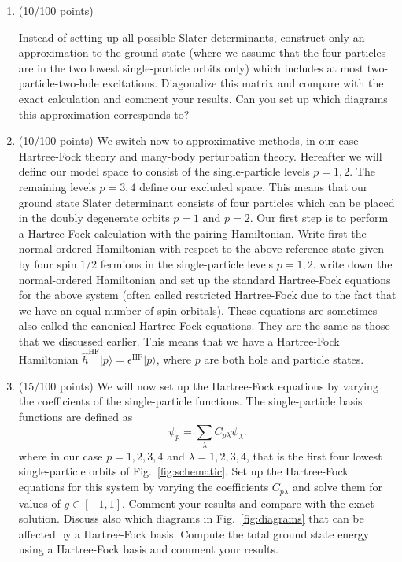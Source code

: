 \documentclass[prc]{revtex4}
\begin{document}
\begin{enumerate}
    \item  (10/100 points)

        Instead of setting up all possible Slater determinants, construct only
        an approximation to the ground state (where we assume that the four
        particles are in the two lowest single-particle orbits only) which
        includes at most two-particle-two-hole excitations. Diagonalize this
        matrix and compare with the exact calculation and comment your
        results. Can you set up which diagrams this approximation corresponds
        to?
    \item  (10/100 points) We switch now to approximative methods, in our case Hartree-Fock
        theory and many-body perturbation theory. Hereafter we will define
        our model space to consist of the single-particle levels $p=1,2$.
        The remaining levels $p=3,4$ define our excluded space.  This means
        that our ground state Slater determinant consists of four particles
        which can be placed in the doubly degenerate orbits $p=1$ and $p=2$.
        Our first step is to perform a Hartree-Fock calculation with the
        pairing Hamiltonian.  Write first the normal-ordered Hamiltonian
        with respect to the above reference state given by four spin $1/2$
        fermions in the single-particle levels $p=1,2$. write down the normal-ordered
        Hamiltonian and set up the standard Hartree-Fock equations for the above system
        (often called restricted Hartree-Fock due to the fact that  we have an equal number of spin-orbitals).
        These equations are sometimes also called the canonical Hartree-Fock equations. They are the same as those that we discussed earlier. This means that we have
        a Hartree-Fock Hamiltonian $\hat{h}^{\mathrm{HF}}\vert p\rangle = \epsilon^{\mathrm{HF}}\vert p\rangle$, where $p$ are both hole and particle states.

    \item  (15/100 points)
        We will now set up the Hartree-Fock equations by varying the
        coefficients of the single-particle functions. The single-particle
        basis functions are defined as
        \[
            \psi_p = \sum_{\lambda} C_{p\lambda}\psi_{\lambda}.
        \]
        where in our case $p=1,2,3,4$ and $\lambda=1,2,3,4$, that is the first
        four lowest single-particle orbits of Fig.~\ref{fig:schematic}.  Set
        up the Hartree-Fock equations for this system by varying the
        coefficients $C_{p\lambda}$ and solve them for values of $g\in
        [-1,1]$.  Comment your results and compare with the exact
        solution. Discuss also which diagrams in Fig.~\ref{fig:diagrams} that
        can be affected by a Hartree-Fock basis. Compute the total ground state energy  using a Hartree-Fock basis and comment your results.


\end{enumerate}
\end{document}
